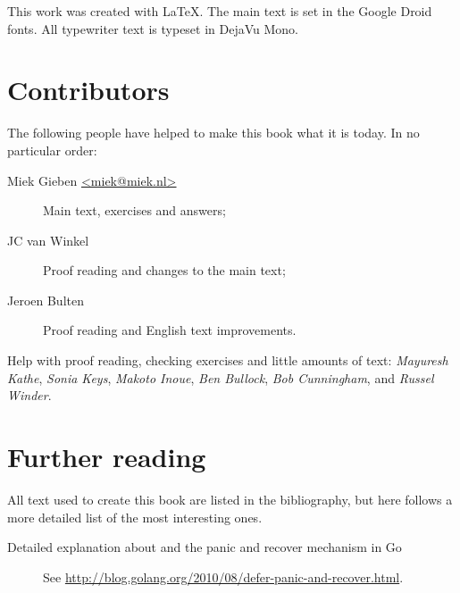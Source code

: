 \noindent{}This work was created with \LaTeX. The main text is set in
the Google Droid fonts. All typewriter text is typeset in DejaVu Mono.

\section{Contributors}
The following people have helped to make this book what it is today.
In no particular order:
\begin{description}
\item[Miek Gieben \qquad\url{<miek@miek.nl>}] 
{Main text, exercises and answers;}
\item[JC van Winkel]
{Proof reading and changes to the main text;}
\item[Jeroen Bulten]
{Proof reading and English text improvements.}
\end{description}

Help with proof reading, checking exercises and little amounts of text:
\emph{Mayuresh Kathe},
\emph{Sonia Keys},
\emph{Makoto Inoue},
\emph{Ben Bullock},
\emph{Bob Cunningham},
and \emph{Russel Winder}.

\section{Further reading}
All text used to create this book are listed in the bibliography, but
here follows a more detailed list of the most interesting ones.
\begin{description}
\item[Detailed explanation about  and the panic and recover
mechanism in Go]{See 
\url{http://blog.golang.org/2010/08/defer-panic-and-recover.html}.}
\end{description}
